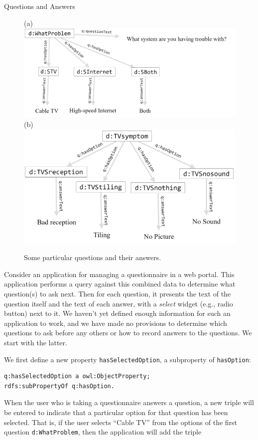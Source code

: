 \begin{example}{Questions and Answers}
\begin{figure}
\centering
(a)
\includegraphics[width=5in]{SWWOv3/media/ch12/figure12-2a.png}
(b)
\includegraphics[width=5in]{SWWOv3/media/ch12/figure12-2b.png}
\caption{Some particular questions and their answers.}
\label{fig:ch12.02}
\end{figure}



Consider an application for managing a questionnaire in a web portal.
This application performs a query against this combined data to
determine what question(s) to ask next. Then for each question, it
presents the text of the question itself and the text of each answer,
with a \emph{select} widget (e.g., radio button) next to it. We haven't yet
defined enough information for such an application to work, and we have
made no provisions to determine which questions to ask before any others
or how to record answers to the questions. We start with the latter.

We first define a new property \texttt{hasSelectedOption}, a subproperty of
\texttt{hasOption}:

\begin{lstlisting}
q:hasSelectedOption a owl:ObjectProperty;
rdfs:subPropertyOf q:hasOption.
\end{lstlisting}

When the user who is taking a questionnaire answers a question, a new
triple will be entered to indicate that a particular option for that
question has been selected. That is, if the user selects ``Cable TV''
from the options of the first question \texttt{d:WhatProblem}, then the
application will add the triple


\end{example}
